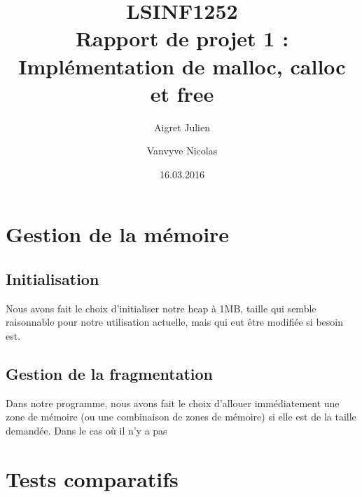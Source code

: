 \documentclass[10pt,a4paper]{article}
\author{Aigret Julien\and Vanvyve Nicolas}
\date{16.03.2016}
\title{LSINF1252\\Rapport de projet 1 :\\Implémentation de malloc, calloc et free}
\begin{document}
\maketitle


\section{Gestion de la mémoire}
\subsection{Initialisation}
Nous avons fait le choix d'initialiser notre heap à 1MB, taille qui semble raisonnable pour notre utilisation actuelle, mais qui eut être modifiée si besoin est.

\subsection{Gestion de la fragmentation}
Dans notre programme, nous avons fait le choix d'allouer immédiatement une zone de mémoire (ou une combinaison de zones de mémoire) si elle est de la taille demandée. Dans le cas où il n'y a pas
\section{Tests comparatifs}





\end{document}
